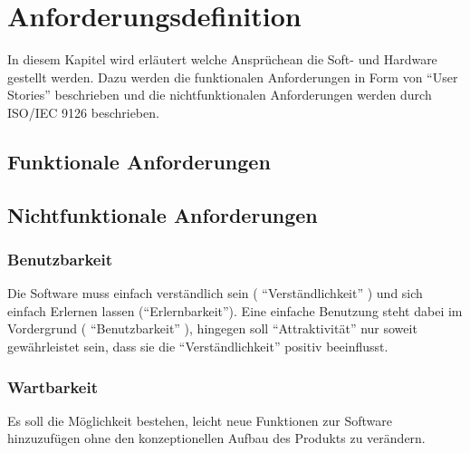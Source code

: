 \chapter{Anforderungsdefinition} %
\label{sec:Anforderungen}
\vspace{-3cm}
\begin{flushleft}
In diesem Kapitel wird erläutert welche Ansprüchean die Soft- und Hardware gestellt werden.
Dazu werden die funktionalen Anforderungen in Form von ``User Stories'' beschrieben und die nichtfunktionalen Anforderungen werden durch ISO/IEC 9126 beschrieben.


\section{Funktionale Anforderungen} %
\label{sec:Funktionale Anforderungen}




\section{Nichtfunktionale Anforderungen} %
\label{sec:Nichtfunktionale Anforderungen}

\subsection{Benutzbarkeit} %
\label{sub:Benutzbarkeit}

Die Software muss einfach verständlich sein ( ``Verständlichkeit'' ) und sich einfach Erlernen lassen (``Erlernbarkeit'').
Eine einfache Benutzung steht dabei im Vordergrund ( ``Benutzbarkeit'' ), hingegen soll ``Attraktivität'' nur soweit gewährleistet sein,
dass sie die ``Verständlichkeit'' positiv beeinflusst. 



\subsection{Wartbarkeit} %
\label{sub:Wartbarkeit}

Es soll die Möglichkeit bestehen, leicht neue Funktionen zur Software hinzuzufügen ohne den konzeptionellen Aufbau des Produkts zu verändern. 


\end{flushleft}
